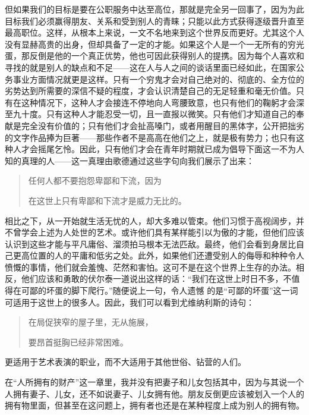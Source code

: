 \documentclass[12pt,oneside]{book}
\begin{document}
但如果我们的目标是要在公职服务中达至高位，那就是完全另一回事了，因为为此目标我们必须赢得朋友、关系和受到别人的青睐；只能以此方式获得逐级晋升直至最高职位。这样，从根本上来说，一文不名地来到这个世界反而更好。尤其这个人没有显赫高贵的出身，但却具备了一定的才能。如果这个人是一个一无所有的穷光蛋，那反倒是他的一个真正优势，他也可因此获得别人的提携。因为每个人喜欢和寻找的就是别人的缺点和不足——这在人与人之间的谈话里面已经如此，在国家公务事业方面情况就更是这样。只有一个穷鬼才会对自己绝对的、彻底的、全方位的劣势达到所需要的深信不疑的程度，才会认识清楚自己的无足轻重和毫无价值。只有在这种情况下，这种人才会接连不停地向人弯腰致意，也只有他们的鞠躬才会深至九十度。只有这种人才能忍受一切，且一直报以微笑。只有他们才知道自己的奉献是完全没有价值的；只有他们才会扯高嗓门，或者用醒目的黑体字，公开把拙劣的文字作品捧为巨著——那些作者不是高高在他们之上，就是极有势力；也只有这种人才会摇尾乞怜。因此，只有他们才会在青年时期就已成为倡导下面这一不为人知的真理的人——这一真理由歌德通过这些字句向我们展示了出来： 

 
\begin{quotation}
任何人都不要抱怨卑鄙和下流，因为 

在这世上只有卑鄙和下流才是威力无比的。 
\end{quotation}
 

相比之下，从一开始就生活无忧的人，却大多难以管束。他们习惯于高视阔步，并不曾学会上述为人处世的艺术。或许他们具有某样能引以为傲的才能，但他们应该认识到这些才能与平凡庸俗、溜须拍马根本无法匹敌。最终，他们会看到身居比自己更高位置的人的平庸和低劣之处。此外，如果他们还遭受别人的侮辱和种种令人愤慨的事情，他们就会羞愧、茫然和害怕。这可不是在这个世界上生存的办法。相反，他们应该和勇敢的伏尔泰一道说出这样的话：“我们在这世上时日不多，不值得在可鄙的坏蛋的脚下爬行。”随便说上一句，令人遗憾
的是“可鄙的坏蛋”这一词可适用于这世上的很多人。因此，我们可以看到尤维纳利斯的诗句：

 
\begin{quotation}
在局促狭窄的屋子里，无从施展， 

要昂首挺胸已经非常困难。 
\end{quotation}


更适用于艺术表演的职业，而不大适用于其他世俗、钻营的人们。 

在“人所拥有的财产”这一章里，我并没有把妻子和儿女包括其中，因为与其说一个人拥有妻子、儿女，还不如说妻子、儿女拥有他。朋友反倒更应该被划入一个人的拥有物里面，但甚至在这问题上，拥有者也还是在某种程度上成为别人的拥有物。 

 
\end{document}
